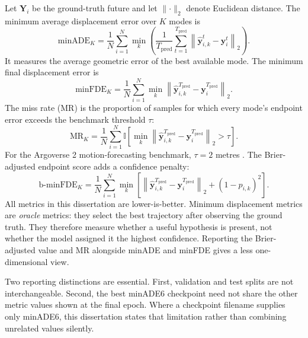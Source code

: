 Let $\mathbf{Y}_i$ be the ground-truth future and let $\lVert\cdot\rVert_2$ denote Euclidean distance. The minimum average displacement error over $K$ modes is
\begin{equation}
    \mathrm{minADE}_K =
    \frac{1}{N}\sum_{i=1}^{N}
    \min_{k}
    \left(
    \frac{1}{T_{\mathrm{pred}}}
    \sum_{t=1}^{T_{\mathrm{pred}}}
    \left\lVert \hat{\mathbf{y}}_{i,k}^{t}-\mathbf{y}_{i}^{t}\right\rVert_2
    \right).
    \label{eq:minade}
\end{equation}
It measures the average geometric error of the best available mode. The minimum final displacement error is
\begin{equation}
    \mathrm{minFDE}_K =
    \frac{1}{N}\sum_{i=1}^{N}
    \min_k
    \left\lVert
    \hat{\mathbf{y}}_{i,k}^{T_{\mathrm{pred}}}-
    \mathbf{y}_{i}^{T_{\mathrm{pred}}}
    \right\rVert_2.
    \label{eq:minfde}
\end{equation}
The miss rate (MR) is the proportion of samples for which every mode's endpoint error exceeds the benchmark threshold $\tau$:
\begin{equation}
    \mathrm{MR}_K = \frac{1}{N}\sum_{i=1}^{N}
    \mathbb{I}\left[
    \min_k \left\lVert
    \hat{\mathbf{y}}_{i,k}^{T_{\mathrm{pred}}}-
    \mathbf{y}_{i}^{T_{\mathrm{pred}}}
    \right\rVert_2 > \tau
    \right].
\end{equation}
For the Argoverse 2 motion-forecasting benchmark, $\tau=2$ metres \cite{wilson2021av2}. The Brier-adjusted endpoint score adds a confidence penalty:
\begin{equation}
    \mathrm{b\mbox{-}minFDE}_K = \frac{1}{N}\sum_{i=1}^{N}
    \min_k \left[
    \left\lVert \hat{\mathbf{y}}_{i,k}^{T_{\mathrm{pred}}}-
    \mathbf{y}_{i}^{T_{\mathrm{pred}}}\right\rVert_2
    + (1-p_{i,k})^2
    \right].
\end{equation}
All metrics in this dissertation are lower-is-better. Minimum displacement metrics are \emph{oracle} metrics: they select the best trajectory after observing the ground truth. They therefore measure whether a useful hypothesis is present, not whether the model assigned it the highest confidence. Reporting the Brier-adjusted value and MR alongside minADE and minFDE gives a less one-dimensional view.

Two reporting distinctions are essential. First, validation and test splits are not interchangeable. Second, the best minADE6 checkpoint need not share the other metric values shown at the final epoch. Where a checkpoint filename supplies only minADE6, this dissertation states that limitation rather than combining unrelated values silently.

